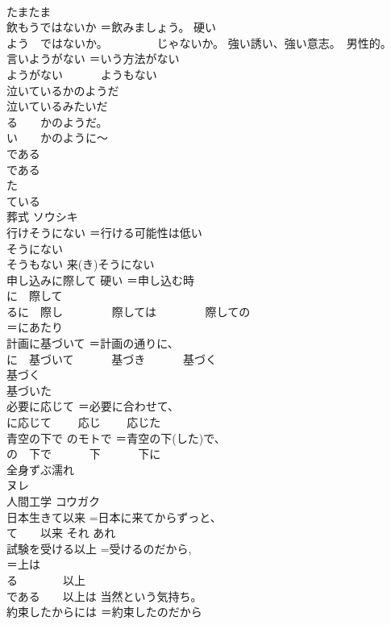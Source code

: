 \documentclass[8pt]{extreport}
\begin{document}
\begin{CJK}{UTF8}{min}
\\	たまたま	
\\	飲もうではないか	＝飲みましょう。 硬い 
\\	よう　ではないか。 　　　　じゃないか。 強い誘い、強い意志。　男性的。
\\	言いようがない	＝いう方法がない 
\\	ようがない 　　　ようもない
\\	泣いているかのようだ	
\\	泣いているみたいだ 
\\	る　　かのようだ。 
\\	い　　かのように〜 
\\	である 
\\	である 
\\	た 
\\	ている
\\	葬式	ソウシキ 
\\	行けそうにない	＝行ける可能性は低い 
\\	そうにない 
\\	そうもない 来(き)そうにない
\\	申し込みに際して	硬い ＝申し込む時 
\\	に　際して 
\\	るに　際し 　　　　際しては 　　　　際しての
\\	＝にあたり
\\	計画に基づいて	＝計画の通りに、
\\	に　基づいて 　　　基づき 　　　基づく
\\	基づく
\\	基づいた
\\	必要に応じて	＝必要に合わせて、
\\	に応じて 　　応じ 　　応じた
\\	青空の下で	のモトで ＝青空の下(した)で、
\\	の　下で 　　　下 　　　下に
\\	全身ずぶ濡れ	
\\	ヌレ
\\	人間工学	コウガク 
\\	日本生きて以来	=日本に来てからずっと、
\\	て　　以来 それ あれ
\\	試験を受ける以上	=受けるのだから, 
\\	＝上は 
\\	る　　　　以上 
\\	である　　以上は 当然という気持ち。
\\	約束したからには	＝約束したのだから 

\end{CJK}
\end{document}
